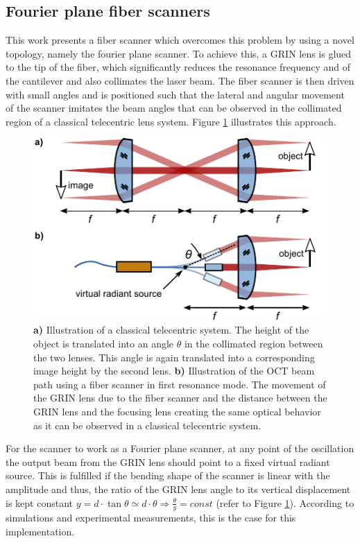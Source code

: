 \documentclass[10pt]{iopart}
\begin{document}
\subsection{Fourier plane fiber scanners}
This work presents a fiber scanner which overcomes this problem by using a novel topology, namely the fourier plane scanner. To achieve this, a GRIN lens is glued to the tip of the fiber, which significantly reduces the resonance frequency and of the cantilever and also collimates the laser beam. The fiber scanner is then driven with small angles and is positioned such that the lateral and angular movement of the scanner imitates the beam angles that can be observed in the collimated region of a classical telecentric lens system. Figure \ref{fig:fps} illustrates this approach. 

\begin{figure}[h!]\centering \includegraphics[width=\columnwidth]{figures/fps2.pdf}
      \caption{\textbf{a)} Illustration of a classical telecentric system. The height of the object is translated into an angle $\theta$ in the collimated region between the two lenses. This angle is again translated into a corresponding image height by the second lens.
      \textbf{b)} Illustration of the OCT beam path using a fiber scanner in first resonance mode. The movement of the GRIN lens due to the fiber scanner and the distance between the GRIN lens and the focusing lens creating the same optical behavior as it can be observed in a classical telecentric system.}
      \label{fig:fps}		
\end{figure}

For the scanner to work as a Fourier plane scanner, at any point of the oscillation the output beam from the GRIN lens should point to a fixed virtual radiant source. This is fulfilled if the bending shape of the scanner is linear with the amplitude and thus, the ratio of the GRIN lens angle to its vertical displacement is kept constant $ y = d \cdot \tan \theta \simeq d \cdot \theta \Rightarrow \frac{\theta}{y} = const $ (refer to Figure \ref{fig:fps}). According to simulations and experimental measurements, this is the case for this implementation.
\end{document}
